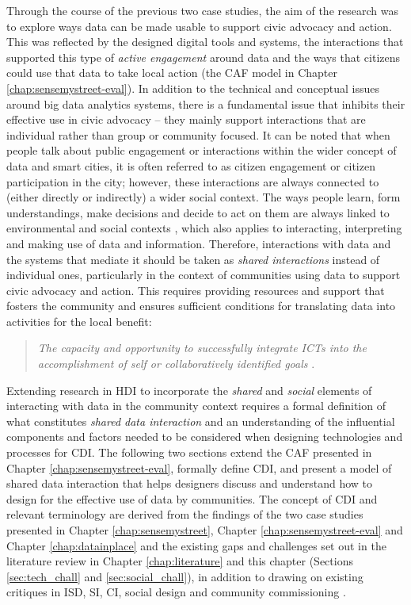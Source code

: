 Through the course of the previous two case studies, the aim of the research was to explore ways data can be made usable to support civic advocacy and action. This was reflected by the designed digital tools and systems, the interactions that supported this type of \textit{active engagement} around data and the ways that citizens could use that data to take local action (the CAF model in Chapter \ref{chap:sensemystreet-eval}). In addition to the technical and conceptual issues around big data analytics systems, there is a fundamental issue that inhibits their effective use in civic advocacy -- they mainly support interactions that are individual rather than group or community focused. It can be noted that when people talk about public engagement or interactions within the wider concept of data and smart cities, it is often referred to as citizen engagement or citizen participation in the city; however, these interactions are always connected to (either directly or indirectly) a wider social context. The ways people learn, form understandings, make decisions and decide to act on them are always linked to environmental and social contexts \citep{dourish_where_2004,suchman_human-machine_2007}, which also applies to interacting, interpreting and making use of data and information. Therefore, interactions with data and the systems that mediate it should be taken as \textit{shared interactions} instead of individual ones, particularly in the context of communities using data to support civic advocacy and action. This requires providing resources and support that fosters the community and ensures sufficient conditions for translating data into activities for the local benefit:

\begin{quote}
    \textit{The capacity and opportunity to successfully integrate ICTs into the accomplishment of self or collaboratively identified goals} \citep{gurstein_effective_2003}.
\end{quote}

Extending research in HDI to incorporate the \textit{shared} and \textit{social} elements of interacting with data in the community context requires a formal definition of what constitutes \textit{shared data interaction} and an understanding of the influential components and factors needed to be considered when designing technologies and processes for CDI. The following two sections extend the CAF presented in Chapter \ref{chap:sensemystreet-eval}, formally define CDI, and present a model of shared data interaction that helps designers discuss and understand how to design for the effective use of data by communities. The concept of CDI and relevant terminology are derived from the findings of the two case studies presented in Chapter \ref{chap:sensemystreet}, Chapter \ref{chap:sensemystreet-eval} and Chapter \ref{chap:datainplace} and the existing gaps and challenges set out in the literature review in Chapter \ref{chap:literature} and this chapter (Sections \ref{sec:tech_chall} and \ref{sec:social_chall}), in addition to drawing on existing critiques in ISD, SI, CI, social design \citep{ferreira_social_2020} and community commissioning \citep{garbett_app_2016}.

